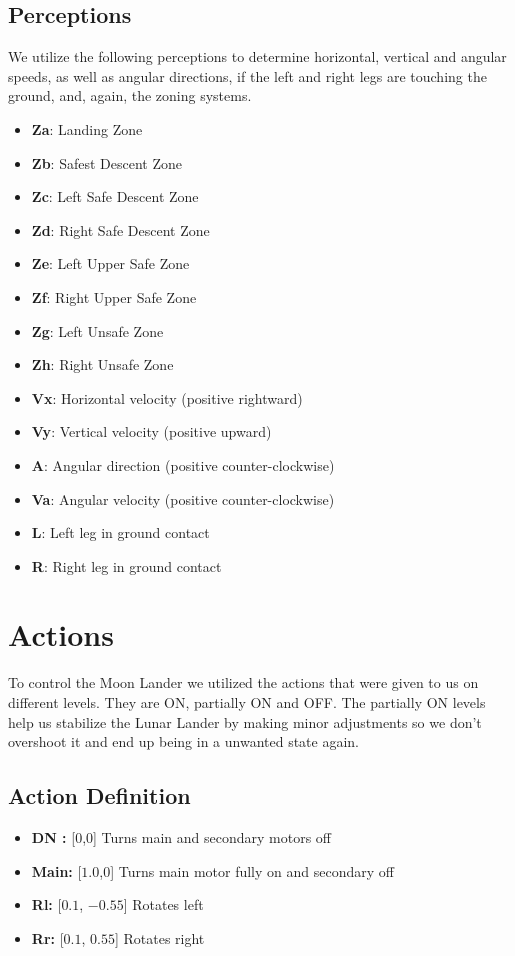 \documentclass{article}
\begin{document}
\subsection{Perceptions}
We utilize the following perceptions to determine horizontal, vertical and angular speeds, as well as angular directions, if the left and right legs are touching the ground, and, again, the zoning systems.

\begin{itemize}
    \item \textbf{Za}: Landing Zone
    \item \textbf{Zb}: Safest Descent Zone
    \item \textbf{Zc}: Left Safe Descent Zone
    \item \textbf{Zd}: Right Safe Descent Zone
    \item \textbf{Ze}: Left Upper Safe Zone
    \item \textbf{Zf}: Right Upper Safe Zone
    \item \textbf{Zg}: Left Unsafe Zone
    \item \textbf{Zh}: Right Unsafe Zone
    \item \textbf{Vx}: Horizontal velocity (positive rightward)
    \item \textbf{Vy}: Vertical velocity (positive upward)
    \item \textbf{A}: Angular direction (positive counter-clockwise)
    \item \textbf{Va}: Angular velocity (positive counter-clockwise)
    \item \textbf{L}: Left leg in ground contact
    \item \textbf{R}: Right leg in ground contact
\end{itemize}

\section{Actions}
To control the Moon Lander we utilized the actions that were given to us on different levels. They are ON, partially ON and OFF. The partially ON levels help us stabilize the Lunar Lander by making minor adjustments so we don't overshoot it and end up being in a unwanted state again.
\subsection{Action Definition}
\begin{itemize}
   \item \textbf{DN :} [$0$,$0$] \hfill Turns main and secondary motors off
   \item \textbf{Main:} [$1.0$,$0$] \hfill Turns main motor fully on and secondary off
   \item \textbf{Rl:} [$0.1$, $-0.55$] \hfill Rotates left
   \item \textbf{Rr:} [$0.1$, $0.55$] \hfill Rotates right
\end{itemize}
\end{document}
